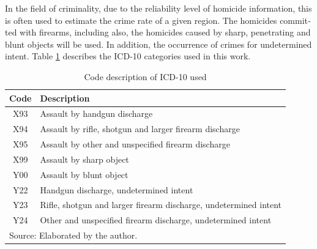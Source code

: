 \documentclass[12pt,openright,oneside,a4paper,english,french,spanish]{abntex2}
\numberwithin{table}{section} %
\numberwithin{figure}{section} %
\begin{document}
\begin{otherlanguage}{english}
In the field of criminality, due to the reliability level of homicide information, this is often used to estimate the crime rate of a given region. The homicides committed with firearms, including also, the homicides caused by sharp, penetrating and blunt objects will be used. In addition, the occurrence of crimes for undetermined intent. Table \ref{tab:cid10} describes the ICD-10 categories used in this work.

\begin{table}[H]
\caption{Code description of ICD-10 used}
\begin{center}
\begin{small}
\begin{tabular}{cl} %
\hline 
Code & Description\\
\hline 
X93 & Assault by handgun discharge\tabularnewline
X94 & Assault by rifle, shotgun and larger firearm discharge\tabularnewline
X95 & Assault by other and unspecified firearm discharge\tabularnewline
X99 & Assault by sharp object\tabularnewline
Y00 & Assault by blunt object\tabularnewline
Y22 & Handgun discharge, undetermined intent\tabularnewline
Y23 & Rifle, shotgun and larger firearm discharge, undetermined intent\tabularnewline
Y24 & Other and unspecified firearm discharge, undetermined intent\tabularnewline
\hline
\multicolumn{2}{l}{Source: Elaborated by the author.}
\end{tabular}
\end{small}
\end{center}
\label{tab:cid10}
\end{table}


\end{otherlanguage}
\end{document}
